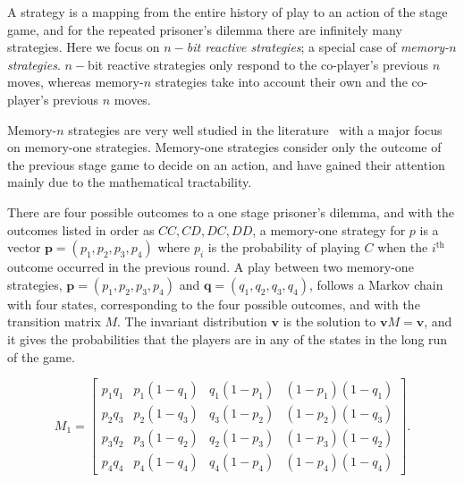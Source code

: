 \documentclass{article}
\theoremstyle{definition}
\begin{document}
A strategy is a mapping from the entire history of play to an action of the
stage game, and for the repeated prisoner's dilemma there are infinitely many
strategies. Here we focus on \textit{\(n-\)bit reactive strategies}; a special case of
\textit{memory-\(n\) strategies}. \(n-\)bit reactive strategies
only respond to the co-player's previous \(n\) moves,
whereas memory-\(n\) strategies take into account their own and the co-player's
previous \(n\) moves.

Memory-\(n\) strategies are very well studied in the
literature~\citep{baek:scientific:2016, hilbe:PNAS:2017,
glynatsi:scientific:2020, press:PNAS:2012, stewart:scientific:2016} with a major
focus on memory-one strategies. Memory-one strategies consider only the outcome
of the previous stage game to decide on an action, and have gained their
attention mainly due to the mathematical tractability.

There are four possible outcomes to a one stage prisoner's dilemma, and with the
outcomes listed in order as \(CC, CD, DC, DD\), a memory-one strategy for \(p\)
is a vector \(\mathbf{p} = (p_1, p_2, p_3, p_4)\) where \(p_i\) is the
probability of playing \(C\) when the \(i^{\text{th}}\) outcome occurred in the
previous round. A play between two memory-one strategies, \(\mathbf{p} = (p_1,
p_2, p_3, p_4)\) and \(\mathbf{q} = (q_1, q_2, q_3, q_4)\), follows a Markov
chain with four states, corresponding to the four possible outcomes, and with
the transition matrix \(M\). The invariant distribution \(\mathbf{v}\) is the
solution to \(\mathbf{v} M = \mathbf{v}\), and it gives the probabilities that
the players are in any of the states in the long run of the game.

\begin{equation}
\displaystyle M_1 = \left[\begin{matrix}p_{1} q_{1} & p_{1} \left(1 - q_{1}\right) & q_{1} \left(1 - p_{1}\right) & \left(1 - p_{1}\right) \left(1 - q_{1}\right)\\
  p_{2} q_{3} & p_{2} \left(1 - q_{3}\right) & q_{3} \left(1 - p_{2}\right) & \left(1 - p_{2}\right) \left(1 - q_{3}\right)\\
  p_{3} q_{2} & p_{3} \left(1 - q_{2}\right) & q_{2} \left(1 - p_{3}\right) & \left(1 - p_{3}\right) \left(1 - q_{2}\right)\\
  p_{4} q_{4} & p_{4} \left(1 - q_{4}\right) & q_{4} \left(1 - p_{4}\right) & \left(1 - p_{4}\right) \left(1 - q_{4}\right)\end{matrix}\right].
\end{equation}
\end{document}
